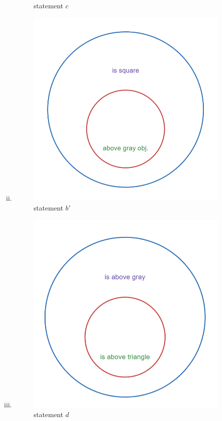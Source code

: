 \documentclass[12pt]{article}
\begin{document}
\begin{enumerate}
\begin{enumerate}[i.]
\begin{figure}[!h]
                            \caption{statement $c$}
                            \label{fig:3.4-30-c}
                        \end{figure}
                \newpage
                \item 
                        \begin{figure}[!h]
                            \centering
                            \includegraphics[width=0.25\linewidth]{Picture Folder//HW02/3.4-30.b'.png}
                            \caption{statement $b'$}
                            \label{fig:3.4-30-b'}
                        \end{figure}

                \item 
                        \begin{figure}[!h]
                            \centering
                            \includegraphics[width=0.25\linewidth]{Picture Folder//HW02/3.4-30-d.png}
                            \caption{statement $d$}
                            \label{fig:3.4-30-d}
                        \end{figure}


\end{enumerate}
\end{enumerate}
\end{document}
